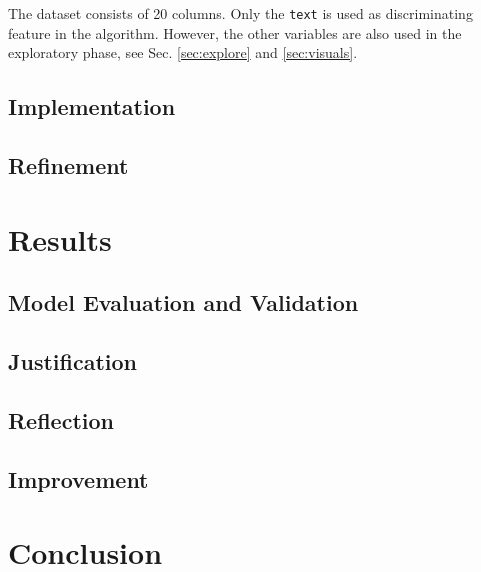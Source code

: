 \documentclass[a4paper,12pt]{article} %
\begin{document}
The dataset consists of 20 columns.
Only the \texttt{text} is used as discriminating feature in the
algorithm. However, the other variables are also used in the exploratory phase,
see Sec. \ref{sec:explore} and \ref{sec:visuals}.



\subsection{Implementation}
\label{sec:implementation}


\subsection{Refinement}




\section{Results}


\subsection{Model Evaluation and Validation}


\subsection{Justification}


\subsection{Reflection}


\subsection{Improvement}


\section{Conclusion}




\nocite{*}

%
\renewcommand{\refname}{References}

\end{document}
